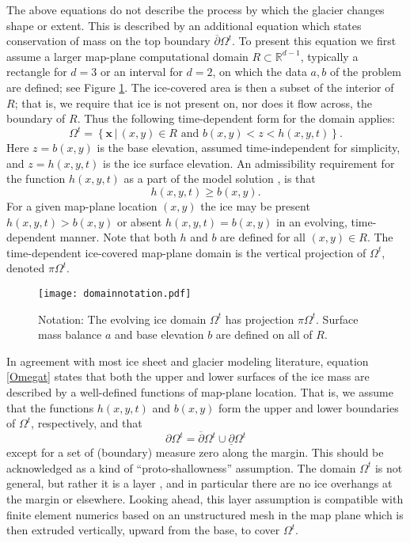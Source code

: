 \documentclass[letterpaper,final,12pt,reqno]{amsart}
\newcommand{\RR}{\mathbb{R}}
\newcommand{\bx}{\mathbf{x}}
\begin{document}
The above equations do not describe the process by which the glacier changes shape or extent.  This is described by an additional equation which states conservation of mass on the top boundary $\overline{\partial} \Omega^t$.  To present this equation we first assume a larger map-plane computational domain $R\subset \RR^{d-1}$, typically a rectangle for $d=3$ or an interval for $d=2$, on which the data $a,b$ of the problem are defined; see Figure \ref{fig:domainnotation}.  The ice-covered area is then a subset of the interior of $R$; that is, we require that ice is not present on, nor does it flow across, the boundary of $R$.  Thus the following time-dependent form for the domain applies:
\begin{equation}
\Omega^t = \left\{\bx\,\big|\,(x,y)\in R \text{ and } b(x,y) < z < h(x,y,t)\right\}.  \label{Omegat}
\end{equation}
Here $z=b(x,y)$ is the base elevation, assumed time-independent for simplicity, and $z=h(x,y,t)$ is the ice surface elevation.  An admissibility requirement for the function $h(x,y,t)$ as a part of the model solution \cite{Bueler2016}, is that
\begin{equation}
h(x,y,t) \ge b(x,y).  \label{admissibility}
\end{equation}
For a given map-plane location $(x,y)$ the ice may be present $h(x,y,t)>b(x,y)$ or absent $h(x,y,t)=b(x,y)$ in an evolving, time-dependent manner.  Note that both $h$ and $b$ are defined for all $(x,y)\in R$.  The time-dependent ice-covered map-plane domain is the vertical projection of $\Omega^t$, denoted $\pi \Omega^t$.

\begin{figure}[h]
\begin{center}
\texttt{[image: domainnotation.pdf]}
\end{center}
\caption{Notation: The evolving ice domain $\Omega^t$ has projection $\pi \Omega^t$.  Surface mass balance $a$ and base elevation $b$ are defined on all of $R$.}
\label{fig:domainnotation}
\end{figure}

In agreement with most ice sheet and glacier modeling literature, equation \eqref{Omegat} states that both the upper and lower surfaces of the ice mass are described by a well-defined functions of map-plane location.  That is, we assume that the functions $h(x,y,t)$ and $b(x,y)$ form the upper and lower boundaries of $\Omega^t$, respectively, and that
    $$\partial \Omega^t = \overline{\partial} \Omega^t \cup \underline{\partial} \Omega^t$$
except for a set of (boundary) measure zero along the margin.  This should be acknowledged as a kind of ``proto-shallowness'' assumption.  The domain $\Omega^t$ is not general, but rather it is a layer \cite{Bueler2020}, and in particular there are no ice overhangs at the margin or elsewhere.  Looking ahead, this layer assumption is compatible with finite element numerics based on an unstructured mesh in the map plane which is then extruded vertically, upward from the base, to cover $\Omega^t$.
\end{document}
